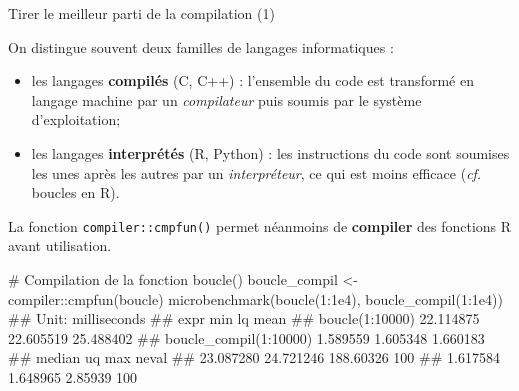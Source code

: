 \documentclass[12pt,ignorenonframetext,handout,]{beamer}
\newenvironment{Shaded}{}{}
\newcommand{\CommentTok}[1]{\textcolor[rgb]{0.00,0.50,0.00}{#1}}
\newcommand{\DecValTok}[1]{#1}
\newcommand{\FloatTok}[1]{#1}
\newcommand{\KeywordTok}[1]{\textcolor[rgb]{0.00,0.00,1.00}{#1}}
\newcommand{\NormalTok}[1]{#1}
\newcommand{\OperatorTok}[1]{#1}
\newcommand{\StringTok}[1]{\textcolor[rgb]{0.00,0.50,0.50}{#1}}
\providecommand{\tightlist}{%
  \setlength{\itemsep}{0pt}\setlength{\parskip}{0pt}}
\renewenvironment{Shaded}{\begin{snugshade}}{\end{snugshade}}
\begin{document}
\begin{frame}[fragile]{Tirer le meilleur parti de la compilation (1)}
\protect\hypertarget{tirer-le-meilleur-parti-de-la-compilation-1}{}

On distingue souvent deux familles de langages informatiques :

\begin{itemize}
\tightlist
\item
  \pause \vspace{-0.2cm} les langages \textbf{compilés} (C, C++) :
  l’ensemble du code est transformé en langage machine par un
  \emph{compilateur} puis soumis par le système d’exploitation;
\item
  \pause les langages \textbf{interprétés} (R, Python) : les
  instructions du code sont soumises les unes après les autres par un
  \emph{interpréteur}, ce qui est moins efficace (\emph{cf.} boucles en
  R).
\end{itemize}

\vspace{0.1cm}

\pause La fonction \texttt{compiler::cmpfun()} permet néanmoins de
\textbf{compiler} des fonctions R avant utilisation.

\pause \footnotesize \vspace{-0.2cm}

\begin{Shaded}
\begin{Highlighting}[]
\CommentTok{# Compilation de la fonction boucle()}
\NormalTok{boucle_compil <-}\StringTok{ }\NormalTok{compiler}\OperatorTok{::}\KeywordTok{cmpfun}\NormalTok{(boucle)}
\KeywordTok{microbenchmark}\NormalTok{(}\KeywordTok{boucle}\NormalTok{(}\DecValTok{1}\OperatorTok{:}\FloatTok{1e4}\NormalTok{), }\KeywordTok{boucle_compil}\NormalTok{(}\DecValTok{1}\OperatorTok{:}\FloatTok{1e4}\NormalTok{))}
\NormalTok{  ## Unit: milliseconds}
\NormalTok{  ##                    expr       min        lq      mean}
\NormalTok{  ##         boucle(1:10000) 22.114875 22.605519 25.488402}
\NormalTok{  ##  boucle_compil(1:10000)  1.589559  1.605348  1.660183}
\NormalTok{  ##     median        uq       max neval}
\NormalTok{  ##  23.087280 24.721246 188.60326   100}
\NormalTok{  ##   1.617584  1.648965   2.85939   100}
\end{Highlighting}
\end{Shaded}

\end{frame}
\end{document}
